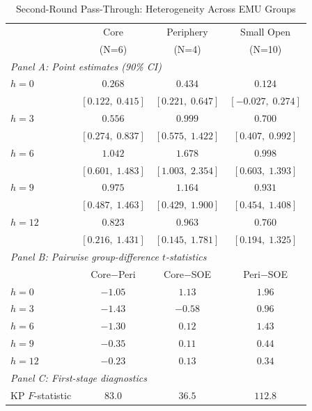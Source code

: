 \begin{table}[htbp]
\centering
\begin{threeparttable}
\caption{Second-Round Pass-Through: Heterogeneity Across EMU Groups}
\label{tab:heterogeneity}
{\small
\begin{tabular}{lccc}
\toprule
 & Core & Periphery & Small Open \\
 & (N=6) & (N=4) & (N=10) \\
\midrule
\multicolumn{4}{l}{\textit{Panel A: Point estimates (90\% CI)}} \\[4pt]
$h=0$ & $0.268$ & $0.434$ & $0.124$ \\
      & \footnotesize{$[0.122,\;0.415]$} & \footnotesize{$[0.221,\;0.647]$} & \footnotesize{$[-0.027,\;0.274]$} \\[2pt]
$h=3$ & $0.556$ & $0.999$ & $0.700$ \\
      & \footnotesize{$[0.274,\;0.837]$} & \footnotesize{$[0.575,\;1.422]$} & \footnotesize{$[0.407,\;0.992]$} \\[2pt]
$h=6$ & $1.042$ & $1.678$ & $0.998$ \\
      & \footnotesize{$[0.601,\;1.483]$} & \footnotesize{$[1.003,\;2.354]$} & \footnotesize{$[0.603,\;1.393]$} \\[2pt]
$h=9$ & $0.975$ & $1.164$ & $0.931$ \\
      & \footnotesize{$[0.487,\;1.463]$} & \footnotesize{$[0.429,\;1.900]$} & \footnotesize{$[0.454,\;1.408]$} \\[2pt]
$h=12$ & $0.823$ & $0.963$ & $0.760$ \\
      & \footnotesize{$[0.216,\;1.431]$} & \footnotesize{$[0.145,\;1.781]$} & \footnotesize{$[0.194,\;1.325]$} \\[2pt]
\midrule
\multicolumn{4}{l}{\textit{Panel B: Pairwise group-difference $t$-statistics}} \\[4pt]
 & Core$-$Peri & Core$-$SOE & Peri$-$SOE \\
$h=0$ & $-1.05$ & $1.13$ & $1.96$ \\[2pt]
$h=3$ & $-1.43$ & $-0.58$ & $0.96$ \\[2pt]
$h=6$ & $-1.30$ & $0.12$ & $1.43$ \\[2pt]
$h=9$ & $-0.35$ & $0.11$ & $0.44$ \\[2pt]
$h=12$ & $-0.23$ & $0.13$ & $0.34$ \\[2pt]
\midrule
\multicolumn{4}{l}{\textit{Panel C: First-stage diagnostics}} \\[4pt]
KP $F$-statistic & $83.0$ & $36.5$ & $112.8$ \\

\end{tabular}}
\end{threeparttable}
\end{table}
